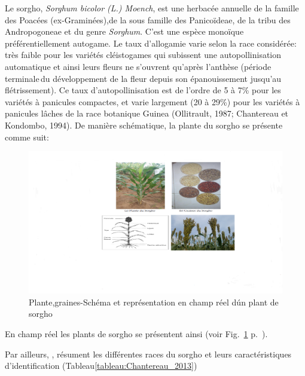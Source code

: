 \documentclass[a4paper,11pt]{article}
\begin{document}
Le sorgho, \emph{Sorghum bicolor (L.) Moench}, est une herbacée annuelle de
la famille des Poacées (ex-Graminées),de la sous famille des Panicoïdeae,
de la tribu des Andropogoneae et du genre \emph{Sorghum}\cite{Doggett_1988}.
C’est une espèce monoïque préférentiellement autogame. Le taux d’allogamie
varie selon la race considérée: très faible pour les variétés cléistogames qui subissent une
autopollinisation automatique et ainsi leurs fleurs ne s’ouvrent qu’après l’anthèse (période terminale\,du développement de la fleur depuis son épanouissement jusqu’au
flétrissement). Ce taux d'autopollinisation est de l’ordre de 5 à 7\% pour les variétés à
panicules compactes\cite{Doggett_1988}, et varie largement (20 à 29\%)
pour les variétés à panicules lâches de la race botanique Guinea
(Ollitrault, 1987; Chantereau et Kondombo, 1994). De manière
schématique, la plante du sorgho se présente comme suit:


 
\begin{figure}%
  \begin{center}
    \includegraphics[width=16cm]{images/SchemaComposePage5}
  \end{center}
  \caption{Plante,graines-Schéma et représentation en champ réel d\'un plant de sorgho}
   \label{fig-SchemaComposePage5}
\end{figure}

En champ réel les plants de sorgho se présentent ainsi (voir
Fig.~\ref{fig-SchemaComposePage5}
p.~\pageref{fig-SchemaComposePage5}).


Par ailleurs, , résument les différentes races du sorgho et
leurs caractéristiques d'identification (Tableau\ref{tableau:Chantereau_2013})
\end{document}
